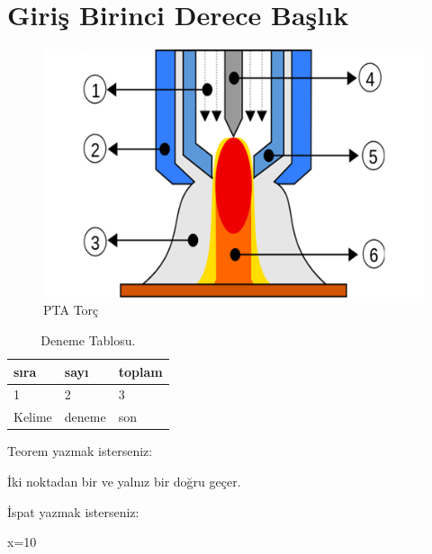 \section{Giriş Birinci Derece Başlık}
\lipsum[1-2]
\begin{figure}[h]
\centering
\includegraphics[width=\textwidth]{gorseller/ptaTorc}
\caption{PTA Torç}\label{fig:PtaTorc1}
\end{figure}
\lipsum[1-2]
\begin{table}
\centering
\caption{Deneme Tablosu.}\label{tab:den1}
\begin{tabular}{|l|l|l|}
\hline
sıra   & sayı   & toplam \\ \hline
1      & 2      & 3      \\ \hline
Kelime & deneme & son    \\ \hline
\end{tabular}
\end{table}
Teorem yazmak isterseniz:
\begin{theorem}[Öklid]
 İki noktadan bir ve yalnız bir doğru geçer.
\end{theorem}

İspat yazmak isterseniz:
\begin{ispat}
x=10
\end{ispat}

